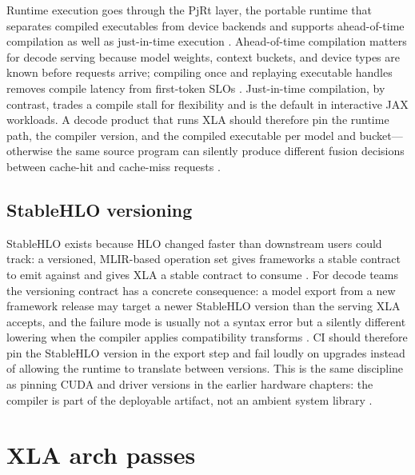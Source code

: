 Runtime execution goes through the PjRt layer, the portable runtime that separates compiled executables from device backends and supports ahead-of-time compilation as well as just-in-time execution \citep{openxla2024}. Ahead-of-time compilation matters for decode serving because model weights, context buckets, and device types are known before requests arrive; compiling once and replaying executable handles removes compile latency from first-token SLOs \citep{patel2025llminference,taxbreak2026}. Just-in-time compilation, by contrast, trades a compile stall for flexibility and is the default in interactive JAX workloads. A decode product that runs XLA should therefore pin the runtime path, the compiler version, and the compiled executable per model and bucket---otherwise the same source program can silently produce different fusion decisions between cache-hit and cache-miss requests \citep{memoryfloor2026,openxla2024}.

\subsection{StableHLO versioning}

StableHLO exists because HLO changed faster than downstream users could track: a versioned, MLIR-based operation set gives frameworks a stable contract to emit against and gives XLA a stable contract to consume \citep{openxla2024,lai2023relax}. For decode teams the versioning contract has a concrete consequence: a model export from a new framework release may target a newer StableHLO version than the serving XLA accepts, and the failure mode is usually not a syntax error but a silently different lowering when the compiler applies compatibility transforms \citep{chen2020compilerbasedhardw,patel2025llminference}. CI should therefore pin the StableHLO version in the export step and fail loudly on upgrades instead of allowing the runtime to translate between versions. This is the same discipline as pinning CUDA and driver versions in the earlier hardware chapters: the compiler is part of the deployable artifact, not an ambient system library \citep{yirage2026,memoryfloor2026}.

\section{XLA arch passes}
\label{sec:ch15_xla_arch_passes}


